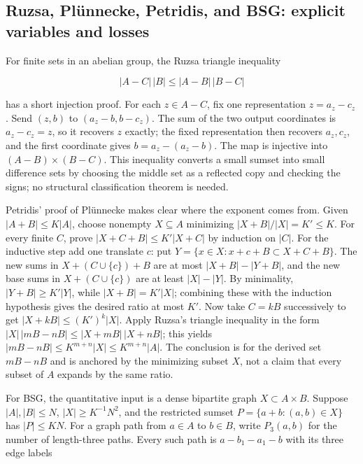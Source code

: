 \subsection{Ruzsa, Plünnecke, Petridis, and BSG: explicit variables and losses}\label{04-visual-computing-ii-ch033-ruzsa-pluxfcnnecke-petridis-and-bsg-explicit-variables-and-losses}

\hypertarget{04-visual-computing-ii-ch033-ruzsa-plünnecke-petridis-and-bsg-explicit-variables-and-losses}{}

For finite sets in an abelian group, the Ruzsa triangle inequality

\[|A-C|\,|B|\le |A-B|\,|B-C|\]

has a short injection proof. For each \(z\in A-C\), fix one representation \(z=a_z-c_z\). Send \((z,b)\) to \((a_z-b,b-c_z)\). The sum of the two output coordinates is \(a_z-c_z=z\), so it recovers \(z\) exactly; the fixed representation then recovers \(a_z,c_z\), and the first coordinate gives \(b=a_z-(a_z-b)\). The map is injective into \((A-B)\times(B-C)\). This inequality converts a small sumset into small difference sets by choosing the middle set as a reflected copy and checking the signs; no structural classification theorem is needed.

Petridis' proof of Plünnecke makes clear where the exponent comes from. Given \(|A+B|\le K|A|\), choose nonempty \(X\subseteq A\) minimizing \(|X+B|/|X|=K' \le K\). For every finite \(C\), prove \(|X+C+B|\le K'|X+C|\) by induction on \(|C|\). For the inductive step add one translate \(c\): put \(Y=\{x\in X:x+c+B\subset X+C+B\}\). The new sums in \(X+(C\cup\{c\})+B\) are at most \(|X+B|-|Y+B|\), and the new base sums in \(X+(C\cup\{c\})\) are at least \(|X|-|Y|\). By minimality, \(|Y+B|\ge K'|Y|\), while \(|X+B|=K'|X|\); combining these with the induction hypothesis gives the desired ratio at most \(K'\). Now take \(C=kB\) successively to get \(|X+kB|\le(K')^k|X|\). Apply Ruzsa's triangle inequality in the form \(|X|\,|mB-nB|\le|X+mB|\,|X+nB|\); this yields \(|mB-nB|\le K^{m+n}|X|\le K^{m+n}|A|\). The conclusion is for the derived set \(mB-nB\) and is anchored by the minimizing subset \(X\), not a claim that every subset of \(A\) expands by the same ratio.

For BSG, the quantitative input is a dense bipartite graph \(X\subset A\times B\). Suppose \(|A|,|B|\le N\), \(|X|\ge K^{-1}N^2\), and the restricted sumset \(P=\{a+b:(a,b)\in X\}\) has \(|P|\le KN\). For a graph path from \(a\in A\) to \(b\in B\), write \(P_3(a,b)\) for the number of length-three paths. Every such path is \(a-b_1-a_1-b\) with its three edge labels

